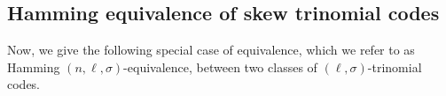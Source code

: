 \documentclass[12pt,paper]{article}
\theoremstyle{plain}
\newcommand{\Fq}{\mathbb{F}_{q}}
\begin{document}

\subsection{ Hamming equivalence  of  skew  trinomial codes}

Now, we give the following special case of equivalence,  which we refer to as  {Hamming $(n,\ell,\sigma)$-equivalence}, between two classes of $(\ell,\sigma)$-trinomial codes. 
\end{document}
